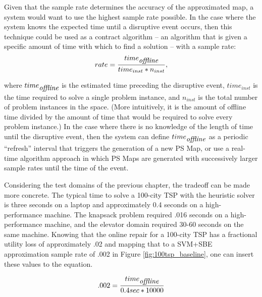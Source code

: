 Given that the sample rate determines the accuracy of the approximated map, a system would want to use the highest sample rate possible.  In the case where the system knows the expected time until a disruptive event occurs, then this technique could be used as a contract algorithm \citep{Zilberstein99real-timeproblem-solving} -- an algorithm that is given a specific amount of time with which to find a solution -- with a sample rate:
\begin{equation*}
rate = \frac{time_{\mbox{\itshape offline}}}{time_{inst}*n_{inst}} ,
\label{eq:tradeoff}
\end{equation*}

\noindent
where $time_{\mbox{\itshape offline}}$ is the estimated time preceding the disruptive event, $time_{inst}$ is the time required to solve a single problem instance, and $n_{inst}$ is the total number of problem instances in the space.  (More intuitively, it is the amount of offline time divided by the amount of time that would be required to solve every problem instance.) In the case where there is no knowledge of the length of time until the disruptive event, then the system can define  $time_{\mbox{\itshape offline}}$ as a periodic ``refresh'' interval that triggers the generation of a new PS Map, or use a real-time algorithm approach in which PS Maps are generated with successively larger sample rates until the time of the event.

Considering the test domains of the previous chapter, the tradeoff can be made more concrete.  The typical time to solve a 100-city TSP with the heuristic solver is three seconds on a laptop and  approximately 0.4 seconds on a high-performance machine.  The knapsack problem required .016 seconds on a high-performance machine, and the elevator domain required 30-60 seconds on the same machine.  Knowing that the online repair for a 100-city TSP has a fractional utility loss of approximately .02 and mapping that to a SVM+SBE approximation sample rate of .002 in Figure \ref{fig:100tsp_baseline}, one can insert these values to the equation.

\begin{equation*}
.002 = \frac{time_{\mbox{\itshape offline}}}{0.4sec * 10000}
\end{equation*}

